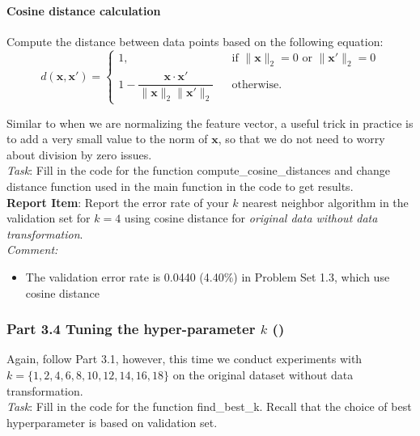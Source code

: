
\paragraph{Cosine distance calculation}
Compute the distance between data points based on the following equation:
$$ d(\mathbf{x}, \mathbf{x}')=\left\{
\begin{array}{lcl}
1, &  & \text{if } \|\mathbf{x}\|_2 = 0 \text{ or } \|\mathbf{x}'\|_2 = 0 \\
1- \dfrac{\mathbf{x} \cdot \mathbf{x}'}{\|\mathbf{x}\|_2\|\mathbf{x}'\|_2} & & \text{otherwise}.
\end{array}
\right.
$$

Similar to when we are normalizing the feature vector, a useful trick in practice is to add a  very small value to the norm of $\mathbf{x}$, so that we do not need to worry about  division by zero issues.\\

\noindent \emph{Task}: Fill in the code for the function \colorbox{Gainsboro!60!Lavender}{compute\_cosine\_distances} and change distance function used in the main function in the code to get results.\\

\noindent \textbf{Report Item}:  Report the error rate of your $k$ nearest neighbor algorithm in the validation set for $k=4$ using cosine distance for \emph{original data without data transformation}.\\

\textit{Comment:}
\begin{itemize}
\item The validation error rate is 0.0440 (4.40\%) in Problem Set 1.3, which use cosine distance
\end{itemize}

\subsubsection*{Part 3.4 Tuning the hyper-parameter $k$ ()}
Again, follow Part 3.1, however, this time we conduct experiments with $k=\{1, 2, 4, 6, 8, 10, 12, 14, 16, 18\}$ on the original dataset without data transformation.\\

\noindent \emph{Task}: Fill in the code for the function \colorbox{Gainsboro!60!Lavender}{find\_best\_k}. Recall that the choice of best hyperparameter is based on validation set.\\


